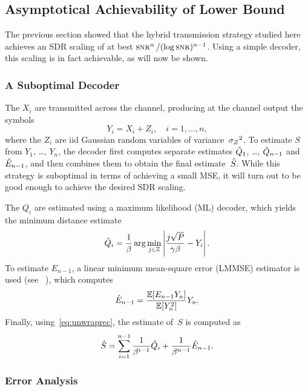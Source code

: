 \subsection{Asymptotical Achievability of Lower Bound}
\label{sec:achievable}

The previous section showed that the hybrid transmission strategy studied here
achieves an SDR scaling of at best $\snr^n/(\log\snr)^{n-1}$. Using a simple
decoder, this scaling is in fact achievable, as will now be shown.

\subsubsection{A Suboptimal Decoder}

The $X_i$ are transmitted across the channel, producing at the channel output
the symbols
\begin{equation*}
  Y_i = X_i + Z_i, \quad i = 1, \dots, n,
\end{equation*}
where the $Z_i$ are iid Gaussian random variables of variance~${{\sigma_Z}^2}$. 
To estimate $S$ from  $Y_1$, \dots, $Y_n$, the decoder first
computes separate estimates $\hat{Q}_1$, \dots, $\hat{Q}_{n-1}$ and $\hat{E}_{n-1}$, and
then combines them to obtain the final estimate~${\hat{S}}$.  While this strategy is
suboptimal in terms of achieving a small MSE, it will turn out to be good enough
to achieve the desired SDR scaling.

The $Q_i$ are estimated using a maximum likelihood (ML) decoder, which yields
the minimum distance estimate
\begin{equation}
  \label{eq:mldecoder}
  \hat{Q}_i = \frac{1}{\beta} \arg \min_{j\in \mathbb{Z}} \left| \frac{j\sqrt{P}}
  {\gamma\beta} - Y_i \right|.
\end{equation}
To estimate $E_{n-1}$, a linear minimum mean-square error (LMMSE)
estimator is used (see \eg~\cite[Section~8.3]{Scharf1990}), which computes
\begin{equation}
  \label{eq:lmmse}
  \hat{E}_{n-1} = \frac{\mathbb{E}[E_{n-1} Y_n]}{\mathbb{E}[Y_n^2]} Y_n.
\end{equation}
Finally, using~\eqref{eq:unwraprec}, the estimate of~$S$ is computed as
\begin{equation}
  \label{eq:unwrapestim}
  {\hat{S}} = \sum_{i=1}^{n-1} \frac{1}{\beta^{i-1}} \hat{Q}_i + \frac{1}{\beta^{n-1}}
  \hat{E}_{n-1}.
\end{equation}


\subsubsection{Error Analysis}

